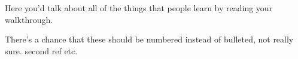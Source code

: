 \documentclass{writeup}
\begin{document}
\begin{conclusion}
Here you'd talk about all of the things that people learn by reading your walkthrough.
\end{conclusion}

\begin{references}
 There's a chance that these should be numbered instead of bulleted, not really sure. 
 second ref
 etc.
\end{references}
\end{document}
